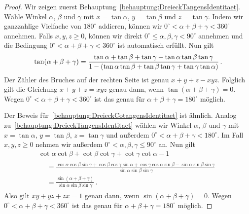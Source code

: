 \begin{proof}
	Wir zeigen zuerst Behauptung~\ref{behauptung:DreieckTangensIdentitaet}. Wähle Winkel $\alpha$, $\beta$ und $\gamma$ mit $x=\tan\alpha$, $y=\tan\beta$ und $z=\tan\gamma$. Indem wir ganzzahlige Vielfache von $180^\circ$ addieren, können wir $0^\circ<\alpha+\beta+\gamma< 360^\circ$ annehmen. Falls $x,y,z\geqslant 0$,  können wir direkt $0^\circ\leqslant \alpha,\beta,\gamma<90^\circ$ annehmen und die Bedingung $0^\circ<\alpha+\beta+\gamma< 360^\circ$ ist automatisch erfüllt. Nun gilt
	\begin{equation*}
		\tan(\alpha+\beta+\gamma)=\frac{\tan\alpha+\tan\beta+\tan\gamma-\tan\alpha\tan\beta\tan\gamma}{1-\parens*{\tan\alpha\tan\beta+\tan\beta\tan\gamma+\tan\gamma\tan\alpha}}\,.
	\end{equation*}
	Der Zähler des Bruches auf der rechten Seite ist genau $x+y+z-xyz$. Folglich gilt die Gleichung $x+y+z=xyz$ genau dann, wenn $\tan(\alpha+\beta+\gamma)=0$. Wegen $0^\circ<\alpha+\beta+\gamma< 360^\circ$ ist das genau für $\alpha+\beta+\gamma=180^\circ$ möglich.
	
	Der Beweis für~\ref{behauptung:DreieckCotangensIdentitaet} ist ähnlich. Analog zu~\ref{behauptung:DreieckTangensIdentitaet} wählen wir Winkel $\alpha$, $\beta$ und $\gamma$ mit $x=\tan\alpha$, $y=\tan\beta$, $z=\tan\gamma$ und außerdem $0^\circ<\alpha+\beta+\gamma< 180^\circ$. Im Fall $x,y,z\geqslant 0$ nehmen wir außerdem $0^\circ <\alpha,\beta,\gamma\leqslant 90^\circ$ an. Nun gilt
	\begin{multline*}
		\cot\alpha\cot\beta+\cot\beta\cot\gamma+\cot\gamma\cot\alpha-1\\
		\begin{aligned}
			&=\frac{\cos\alpha\cos\beta\sin\gamma+\cos\beta\cos\gamma\sin\alpha+\cos\gamma\cos\alpha\sin\beta-\sin\alpha\sin\beta\sin\gamma}{\sin\alpha\sin\beta\sin\gamma}\\
			&=\frac{\sin(\alpha+\beta+\gamma)}{\sin\alpha\sin\beta\sin\gamma}\,.
		\end{aligned}
	\end{multline*}
	Also gilt $xy+yz+zx=1$ genau dann, wenn $\sin(\alpha+\beta+\gamma)=0$. Wegen $0^\circ<\alpha+\beta+\gamma< 360^\circ$ ist das genau für $\alpha+\beta+\gamma=180^\circ$ möglich.
	

\end{proof}
